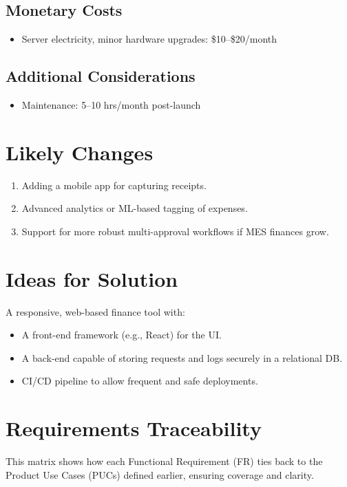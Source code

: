 \documentclass[12pt]{article}
\begin{document}
\subsection{Monetary Costs}
\begin{itemize}
  \item Server electricity, minor hardware upgrades: \$10--\$20/month
\end{itemize}

\subsection{Additional Considerations}
\begin{itemize}
  \item Maintenance: 5--10 hrs/month post-launch
\end{itemize}

\section{Likely Changes}
\begin{enumerate}
  \item Adding a mobile app for capturing receipts.
  \item Advanced analytics or ML-based tagging of expenses.
  \item Support for more robust multi-approval workflows if MES finances grow.
\end{enumerate}

\section{Ideas for Solution}
A responsive, web-based finance tool with:
\begin{itemize}
  \item A front-end framework (e.g., React) for the UI.
  \item A back-end capable of storing requests and logs securely in a relational DB.
  \item CI/CD pipeline to allow frequent and safe deployments.
\end{itemize}

\section{Requirements Traceability}
This matrix shows how each Functional Requirement (FR) ties back to the Product Use Cases (PUCs) defined earlier, ensuring coverage and clarity.
\end{document}
